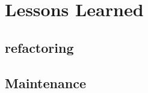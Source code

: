 \section{Lessons Learned}
\label{sec:lessons_learned}
\subsection{refactoring}
\subsection{Maintenance}
